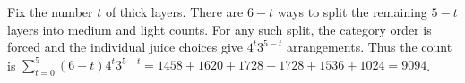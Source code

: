Fix the number $t$ of thick layers. There are $6-t$ ways to split the remaining $5-t$ layers into medium and light counts. For any such split, the category order is forced and the individual juice choices give $4^t3^{5-t}$ arrangements. Thus the count is $\sum_{t=0}^{5}(6-t)4^t3^{5-t}=1458+1620+1728+1728+1536+1024=\boxed{9094}$.
